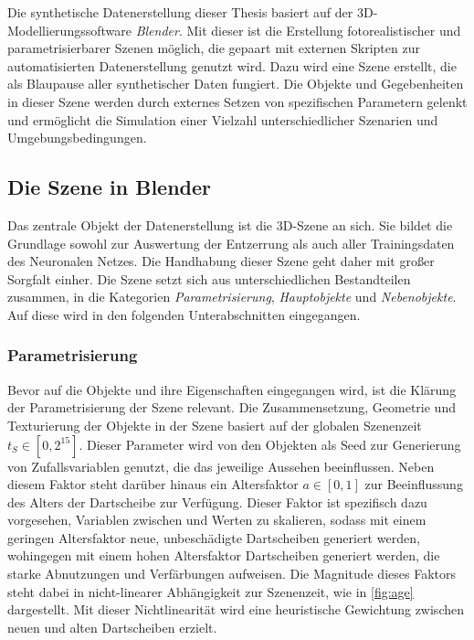 Die synthetische Datenerstellung dieser Thesis basiert auf der 3D-Modellierungssoftware \textit{Blender}\cite{blender}. Mit dieser ist die Erstellung fotorealistischer und parametrisierbarer Szenen möglich, die gepaart mit externen Skripten zur automatisierten Datenerstellung genutzt wird. Dazu wird eine Szene erstellt, die als Blaupause aller synthetischer Daten fungiert. Die Objekte und Gegebenheiten in dieser Szene werden durch externes Setzen von spezifischen Parametern gelenkt und ermöglicht die Simulation einer Vielzahl unterschiedlicher Szenarien und Umgebungsbedingungen.


\subsection{Die Szene in Blender}
\label{sec:impl:daten:blender}

Das zentrale Objekt der Datenerstellung ist die 3D-Szene an sich. Sie bildet die Grundlage sowohl zur Auswertung der Entzerrung als auch aller Trainingsdaten des Neuronalen Netzes. Die Handhabung dieser Szene geht daher mit großer Sorgfalt einher. Die Szene setzt sich aus unterschiedlichen Bestandteilen zusammen, in die Kategorien \textit{Parametrisierung}, \textit{Hauptobjekte} und \textit{Nebenobjekte}. Auf diese wird in den folgenden Unterabschnitten eingegangen.


\subsubsection{Parametrisierung}
\label{sec:impl:daten:blender:parameter}

Bevor auf die Objekte und ihre Eigenschaften eingegangen wird, ist die Klärung der Parametrisierung der Szene relevant. Die Zusammensetzung, Geometrie und Texturierung der Objekte in der Szene basiert auf der globalen Szenenzeit $t_S \in [0, 2^{15}]$. Dieser Parameter wird von den Objekten als Seed zur Generierung von Zufallsvariablen genutzt, die das jeweilige Aussehen beeinflussen. Neben diesem Faktor steht darüber hinaus ein Altersfaktor $a \in [0, 1]$ zur Beeinflussung des Alters der Dartscheibe zur Verfügung. Dieser Faktor ist spezifisch dazu vorgesehen, Variablen zwischen  und  Werten zu skalieren, sodass mit einem geringen Altersfaktor neue, unbeschädigte Dartscheiben generiert werden, wohingegen mit einem hohen Altersfaktor Dartscheiben generiert werden, die starke Abnutzungen und Verfärbungen aufweisen. Die Magnitude dieses Faktors steht dabei in nicht-linearer Abhängigkeit zur Szenenzeit, wie in \autoref{fig:age} dargestellt. Mit dieser Nichtlinearität wird eine heuristische Gewichtung zwischen neuen und alten Dartscheiben erzielt.

